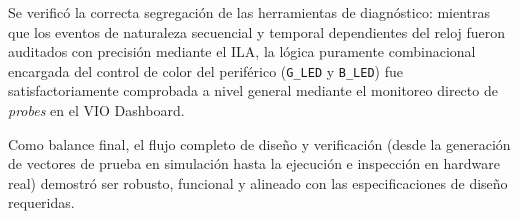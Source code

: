 \documentclass[11pt,a4paper]{article}
\begin{document}
Se verificó la correcta segregación de las herramientas de diagnóstico:
mientras que los eventos de naturaleza secuencial y temporal dependientes del
reloj fueron auditados con precisión mediante el ILA, la lógica puramente
combinacional encargada del control de color del periférico (\texttt{G\_LED} y
\texttt{B\_LED}) fue satisfactoriamente comprobada a nivel general mediante el
monitoreo directo de \textit{probes} en el VIO Dashboard.

Como balance final, el flujo completo de diseño y verificación (desde la
generación de vectores de prueba en simulación hasta la ejecución e inspección
en hardware real) demostró ser robusto, funcional y alineado con las
especificaciones de diseño requeridas.
\end{document}
